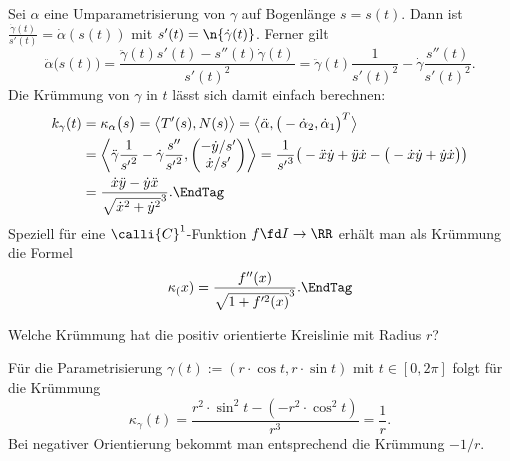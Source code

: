   \begin{antwort}
    Sei $\alpha$ eine Umparametrisierung von $\gamma$ 
    auf Bogenlänge $s=s(t)$. Dann ist 
    $\frac{\dot{\gamma}(t) }{ s'(t) } = \dot{\alpha}( s(t) )$ 
    mit $s'(t)=\n{ \dot{\gamma}(t) }$. Ferner 
    gilt 
    \[
    \ddot{\alpha} \big(  s(t) \big) = 
    \frac{
      \ddot{\gamma}(t) s'(t) - s''(t) \dot{\gamma}(t)}{s'(t)^2} 
    = \ddot{\gamma}(t) \frac{1}{s'(t)^2} - 
    \dot{\gamma} \frac{s''(t)}{s'(t)^2}. 
    \]
    Die Krümmung von $\gamma$ in $t$ lässt sich damit 
    einfach berechnen: 
    \begin{align*}
      k_\gamma(t) &= 
      \kappa_\alpha \big( s \big) = 
      \big\langle T'(s ) , N(s) \big\rangle = 
      \big\langle \ddot{\alpha}, 
      \big( -\dot{\alpha}_2, \dot{\alpha}_1 \big)^T 
      \big\rangle \\
      &=\left\langle 
        \ddot{\gamma}\frac{1}{{s'}^2} - 
        \dot{\gamma} \frac{s''}{{s'}^2}, 
        \begin{pmatrix}
          -\dot{y}/s' \\  \dot{x}/s' 
        \end{pmatrix} \right\rangle 
      = \frac{1}{ {s'}^3 } \big(  
      -\ddot{x} \dot{y} + \ddot{y} \dot{x} - 
      \big( - \dot{x} \dot{y} + \dot{y} \dot{x} 
      \big) \big)
      \\
      &= \frac{\dot{x}\ddot{y} - \dot{y}\ddot{x} }{ 
        \sqrt{\dot{x}^2 + \dot{y}^2 }^3 }. 
      \EndTag 
    \end{align*}
    Speziell für eine $\calli{C}^1$-Funktion 
    $f\fd I\to\RR$ erhält man als Krümmung die Formel 
    \[
    \kappa_(x) = \frac{f''(x)}{\sqrt{1+f'^2 (x) }^3 }. \EndTag
    \]
  \end{antwort} 

  \begin{frage}
    Welche Krümmung hat die positiv orientierte Kreislinie mit Radius $r$? 
  \end{frage}

  \begin{antwort}
    Für die Parametrisierung 
    $\gamma(t):= ( r\cdot \cos t, r\cdot \sin t )$ mit $t\in [0,2\pi]$ 
    folgt für die Krümmung 
    \[
    \kappa_\gamma( t ) = \frac{ r^2 \cdot \sin^2 t - 
      (- r^2 \cdot \cos^2 t)}{r^3} = \frac{1}{r}.
    \]
    Bei negativer Orientierung bekommt man entsprechend die Krümmung $-1/r$. 
    \AntEnd
  \end{antwort} 




